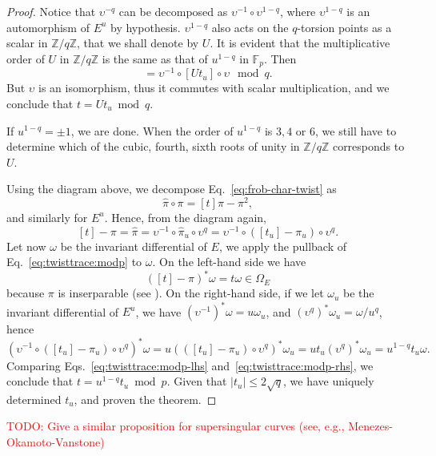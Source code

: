 \documentclass[12pt]{article}
\theoremstyle{plain}
\theoremstyle{definition}
\newcommand{\todo}[1]{\textcolor{red}{TODO: #1}}
\def\Z{\ensuremath{\mathbb{Z}}}
\def\F{\ensuremath{\mathbb{F}}}
\begin{document}
\begin{proof}
  Notice that $\upsilon^{-q}$ can be decomposed as
  $\upsilon^{-1}\circ\upsilon^{1-q}$, where $\upsilon^{1-q}$ is an
  automorphism of $E^u$ by hypothesis. $\upsilon^{1-q}$ also acts on
  the $q$-torsion points as a scalar in $\Z/q\Z$, that we shall denote
  by $U$. It is evident that the multiplicative order of $U$ in $\Z/q\Z$
  is the same as that of $u^{1-q}$ in $\F_p$. Then
  \begin{equation*}
    [t] = \upsilon^{-1}\circ[Ut_u]\circ\upsilon\mod q.
  \end{equation*}
  But $\upsilon$ is an isomorphism, thus it commutes with scalar
  multiplication, and we conclude that $t=Ut_u\bmod q$.

  If $u^{1-q}=\pm1$, we are done. When the order of $u^{1-q}$ is $3,4$
  or $6$, we still have to determine which of the cubic, fourth, sixth
  roots of unity in $\Z/q\Z$ corresponds to $U$.

  Using the diagram above, we decompose
  Eq.~\eqref{eq:frob-char-twist} as
  \begin{equation*}
    \hat\pi\circ\pi = [t]\pi - \pi^2,
  \end{equation*}
  and similarly for $E^u$. Hence, from the diagram again,
  \begin{equation}
    \label{eq:twisttrace:modp}
    [t] - \pi = \hat\pi = \upsilon^{-1}\circ\hat\pi_u\circ\upsilon^q 
    =  \upsilon^{-1}\circ([t_u] - \pi_u)\circ\upsilon^q.
  \end{equation}
  Let now $\omega$ be the invariant differential of $E$, we apply the
  pullback of Eq.~\eqref{eq:twisttrace:modp} to $\omega$. On the
  left-hand side we have
  \begin{equation}
    \label{eq:twisttrace:modp-lhs}
    ([t]-\pi)^\ast\omega = t\omega\in\Omega_E
  \end{equation}
  because $\pi$ is inserparable (see \cite[\S~5]{Sil}). On the
  right-hand side, if we let $\omega_u$ be the invariant differential
  of $E^u$, we have $(\upsilon^{-1})^\ast\omega=u\omega_u$, and
  $(\upsilon^q)^\ast\omega_u=\omega/u^q$, hence
  \begin{equation}
    \label{eq:twisttrace:modp-rhs}
    (\upsilon^{-1}\circ([t_u] - \pi_u)\circ\upsilon^q)^\ast\omega =
    u(([t_u] - \pi_u)\circ\upsilon^q)^\ast\omega_u =
    ut_u(\upsilon^q)^\ast\omega_u = u^{1-q}t_u\omega.
  \end{equation}
  Comparing Eqs.~\eqref{eq:twisttrace:modp-lhs}
  and~\eqref{eq:twisttrace:modp-rhs}, we conclude that $t = u^{1-q}t_u
  \bmod p$. Given that $\lvert t_u\rvert\le2\sqrt{q}$, we have uniquely determined $t_u$, and proven the theorem.
\end{proof}

\todo{Give a similar proposition for supersingular curves (see, e.g.,
  Menezes-Okamoto-Vanstone)}




\end{document}
